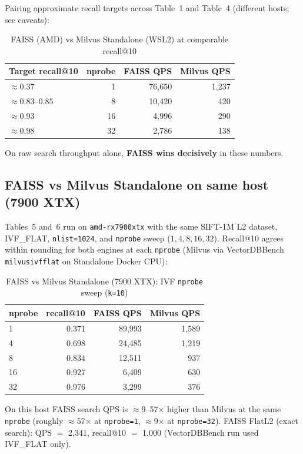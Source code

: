 \documentclass[11pt,a4paper]{article}
\begin{document}
Pairing approximate recall targets across Table~1 and Table~4 (different hosts; see caveats):
\begin{table}[h]
\centering
\caption{FAISS (AMD) vs Milvus Standalone (WSL2) at comparable recall@10}
\begin{tabular}{@{}lrrr@{}}
\toprule
\textbf{Target recall@10} & \textbf{nprobe} & \textbf{FAISS QPS} & \textbf{Milvus QPS} \\
\midrule
$\approx 0.37$ & 1  & 76{,}650 & 1{,}237 \\
$\approx 0.83$--$0.85$ & 8  & 10{,}420 & 420 \\
$\approx 0.93$ & 16 & 4{,}996 & 290 \\
$\approx 0.98$ & 32 & 2{,}786 & 138 \\
\bottomrule
\end{tabular}
\end{table}

On raw search throughput alone, \textbf{FAISS wins decisively} in these numbers.

\subsection{FAISS vs Milvus Standalone on same host (7900 XTX)}

Tables~5 and~6 run on \texttt{amd-rx7900xtx} with the same SIFT-1M L2 dataset, IVF\_FLAT,
\texttt{nlist=1024}, and \texttt{nprobe} sweep ($1,4,8,16,32$). Recall@10 agrees within
rounding for both engines at each \texttt{nprobe} (Milvus via VectorDBBench
\texttt{milvusivfflat} on Standalone Docker CPU):
\begin{table}[h]
\centering
\caption{FAISS vs Milvus Standalone (7900 XTX): IVF \texttt{nprobe} sweep (\texttt{k=10})}
\begin{tabular}{@{}lrrr@{}}
\toprule
\textbf{nprobe} & \textbf{recall@10} & \textbf{FAISS QPS} & \textbf{Milvus QPS} \\
\midrule
1  & 0.371 & 89{,}993 & 1{,}589 \\
4  & 0.698 & 24{,}485 & 1{,}219 \\
8  & 0.834 & 12{,}511 &   937 \\
16 & 0.927 &  6{,}409 &   630 \\
32 & 0.976 &  3{,}299 &   376 \\
\bottomrule
\end{tabular}
\end{table}

On this host FAISS search QPS is $\approx$9--57$\times$ higher than Milvus at the same
\texttt{nprobe} (roughly $\approx$57$\times$ at \texttt{nprobe=1}, $\approx$9$\times$ at
\texttt{nprobe=32}). FAISS FlatL2 (exact search): QPS $=$ 2{,}341, recall@10 $=$ 1.000
(VectorDBBench run used IVF\_FLAT only).
\end{document}
